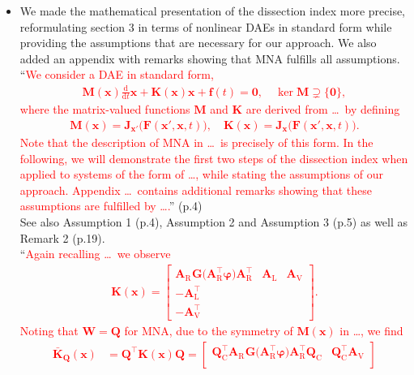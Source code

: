 \documentclass[a4paper, 10pt,
    ]{article}
\newcommand{\mb}[1]{\mathbf{#1}}
\newcommand{\mbb}[1]{\bar{\mathbf{#1}}}
\newcommand{\mr}[1]{\mathrm{#1}}
\newcommand{\T}{{\!\top}}
\newcommand{\ddt}{\frac{\mathrm{d}}{\mathrm{d}t}}
\newcommand{\A}[1]{\mb{A}_\mr{#1}}
\newcommand{\AT}[1]{\mb{A}_\mr{#1}^{\T}}
\newcommand{\vphi}{\boldsymbol{\varphi}}
\begin{document}
\begin{itemize}
\begin{itemize}
            \item We made the mathematical presentation of the dissection index more precise, reformulating section 3 in terms of nonlinear DAEs in standard form while providing the assumptions that are necessary for our approach. We also added an appendix with remarks showing that MNA fulfills all assumptions.\\
            ``\textcolor{red}{We consider a DAE in standard form,
            \begin{align}
                \mb{M}(\mb{x}) \ddt \mb{x} + \mb{K}(\mb{x}) \mb{x} + \mb{f}(t) = \mb{0}, \quad \ker \mb{M} \supsetneq \{ \mb{0} \},
            \end{align}
            where the matrix-valued functions $\mb{M}$ and $\mb{K}$ are derived from \dots\ by defining
            \begin{align*}
                \mb{M}(\mb{x}) = \mb{J}_{\mb{x}'} \big( \mb{F}(\mb{x}', \mb{x}, t) \big), \quad \mb{K}(\mb{x}) = \mb{J}_{\mb{x}} \big( \mb{F}(\mb{x}', \mb{x}, t) \big).
            \end{align*}
            Note that the description of MNA in \dots\ is precisely of this form. In the following, we will demonstrate the first two steps of the dissection index when applied to systems of the form of \dots, while stating the assumptions of our approach. Appendix \dots\ contains additional remarks showing that these assumptions are fulfilled by \dots.}'' (p.4)\\
            See also Assumption 1 (p.4), Assumption 2 and Assumption 3 (p.5) as well as Remark 2 (p.19).\\
            ``\textcolor{red}{Again recalling \dots\ we observe
            \begin{align*}
                \mb{K}(\mb{x}) = \begin{bmatrix}
                    \A{R}^{\phantom{\T}} \mb{G} \big( \AT{R} \vphi \big) \AT{R} & \A{L} & \A{V}\\
                    -\AT{L} & &\\
                    -\AT{V} & &
                \end{bmatrix}.
            \end{align*}
            Noting that $\mb{W} = \mb{Q}$ for MNA, due to the symmetry of $\mb{M}(\mb{x})$ in \dots, we find
            \begin{align*}
                \mbb{K}_\mb{Q}(\mb{x}) &= \mb{Q}^\T \mb{K}(\mb{x}) \mb{Q} = \begin{bmatrix}
                    \mb{Q}_\mr{C}^\T \A{R}^{\phantom{\T}} \mb{G} \big( \AT{R} \vphi \big) \AT{R} \mb{Q}_\mr{C} & \mb{Q}_\mr{C}^\T \A{V}\\

\end{bmatrix}
\end{align*}}
\end{itemize}
\end{itemize}
\end{document}
